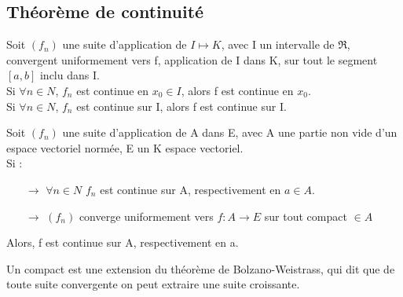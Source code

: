 \subsection{Théorème de continuité}
\begin{theo}
Soit $(f_n)$ une suite d'application de $I\mapsto K$, avec I un intervalle de $\Re$, convergent uniformement vers f, application de I dans K, sur tout le segment $[a,b]$ inclu dans I.\\
Si $\forall n \in N$, $f_n$ est continue en $x_0 \in I$, alors f est continue en $x_0$.\\
Si $\forall n \in N$, $f_n$ est continue sur I, alors f est continue sur I.
\end{theo}
\begin{gene}
Soit $(f_n)$ une suite d'application de A dans E, avec A une partie non vide d'un espace vectoriel normée, E un K espace vectoriel.\\
Si : \\
\begin{itemize}
 \item[$\rightarrow$] $\forall n \in N$ $f_n$ est continue sur A, respectivement en $a \in A$.\\
 \item[$\rightarrow$] $(f_n)$ converge uniformement vers $f : A \rightarrow E$ sur tout compact $\in A$\\
\end{itemize}
Alors, f est continue sur A, respectivement en a.
\end{gene}
\begin{de}
Un compact est une extension du théorème de Bolzano-Weistrass, qui dit que de toute suite convergente on peut extraire une suite croissante.
\end{de}
